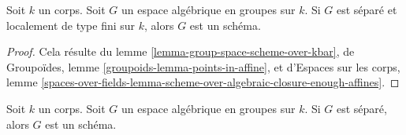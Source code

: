 \begin{lemma}
\label{lemma-group-space-scheme-locally-finite-type-over-k}
Soit $k$ un corps. Soit $G$ un espace algébrique en groupes sur $k$.
Si $G$ est séparé et localement de type fini sur $k$,
alors $G$ est un schéma.
\end{lemma}

\begin{proof}
Cela résulte du
lemme \ref{lemma-group-space-scheme-over-kbar},
de Groupoïdes, lemme \ref{groupoids-lemma-points-in-affine}, et
d'Espaces sur les corps, lemme
\ref{spaces-over-fields-lemma-scheme-over-algebraic-closure-enough-affines}.
\end{proof}

\begin{proposition}
\label{proposition-group-space-scheme-over-field}
Soit $k$ un corps. Soit $G$ un espace algébrique en groupes sur $k$.
Si $G$ est séparé, alors $G$ est un schéma.
\end{proposition}


